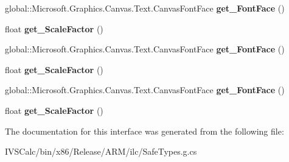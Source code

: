 \begin{DoxyCompactItemize}
global\+::\+Microsoft.\+Graphics.\+Canvas.\+Text.\+Canvas\+Font\+Face {\bfseries get\+\_\+\+Font\+Face} ()
\item 
\mbox{\label{interface_microsoft_1_1_graphics_1_1_canvas_1_1_text_1_1_i_canvas_scaled_font_afe414884a65c9c522daf4946562f95c2}} 
float {\bfseries get\+\_\+\+Scale\+Factor} ()
\item 
\mbox{\label{interface_microsoft_1_1_graphics_1_1_canvas_1_1_text_1_1_i_canvas_scaled_font_a436e710a0b960abd5f5df8368b8725ae}} 
global\+::\+Microsoft.\+Graphics.\+Canvas.\+Text.\+Canvas\+Font\+Face {\bfseries get\+\_\+\+Font\+Face} ()
\item 
\mbox{\label{interface_microsoft_1_1_graphics_1_1_canvas_1_1_text_1_1_i_canvas_scaled_font_afe414884a65c9c522daf4946562f95c2}} 
float {\bfseries get\+\_\+\+Scale\+Factor} ()
\item 
\mbox{\label{interface_microsoft_1_1_graphics_1_1_canvas_1_1_text_1_1_i_canvas_scaled_font_a436e710a0b960abd5f5df8368b8725ae}} 
global\+::\+Microsoft.\+Graphics.\+Canvas.\+Text.\+Canvas\+Font\+Face {\bfseries get\+\_\+\+Font\+Face} ()
\item 
\mbox{\label{interface_microsoft_1_1_graphics_1_1_canvas_1_1_text_1_1_i_canvas_scaled_font_afe414884a65c9c522daf4946562f95c2}} 
float {\bfseries get\+\_\+\+Scale\+Factor} ()
\end{DoxyCompactItemize}


The documentation for this interface was generated from the following file\+:\begin{DoxyCompactItemize}
\item 
I\+V\+S\+Calc/bin/x86/\+Release/\+A\+R\+M/ilc/Safe\+Types.\+g.\+cs\end{DoxyCompactItemize}

